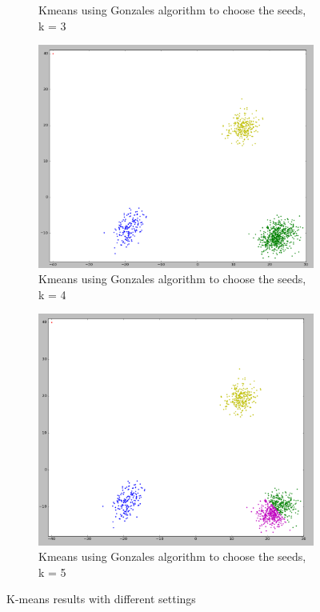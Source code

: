 \begin{figure}
\begin{subfigure}{.33\textwidth}
    \caption{Kmeans using Gonzales algorithm to choose the seeds, k = 3}
    \label{1-trilinear-compositing}
  \end{subfigure}
  \begin{subfigure}{.33\textwidth}
    \centering
    \includegraphics[width=\textwidth]{shots/clusters-gonz-4}
    \caption{Kmeans using Gonzales algorithm to choose the seeds, k = 4}
    \label{1-trilinear-compositing}
  \end{subfigure}
  \begin{subfigure}{.33\textwidth}
    \centering
    \includegraphics[width=\textwidth]{shots/clusters-gonz-5}
    \caption{Kmeans using Gonzales algorithm to choose the seeds, k = 5}
    \label{1-trilinear-compositing}
  \end{subfigure}
  \caption{K-means results with different settings}
  \label{clustering_result}
\end{figure}
